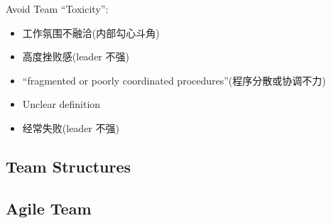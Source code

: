 Avoid Team ``Toxicity'':
\begin{itemize}
    \item 工作氛围不融洽(内部勾心斗角)
    \item 高度挫败感(leader 不强)
    \item ``fragmented or poorly coordinated procedures''(程序分散或协调不力)
    \item Unclear definition
    \item 经常失败(leader 不强)
\end{itemize}

\subsection{Team Structures}

\subsection{Agile Team}